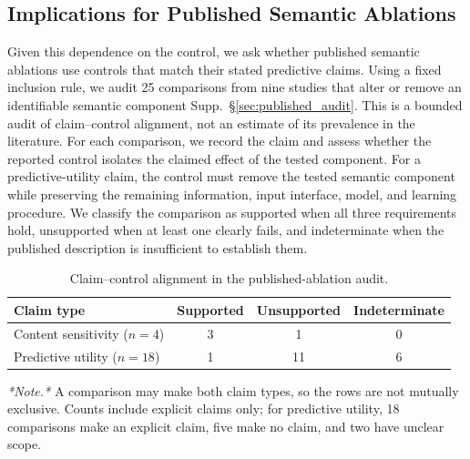 \documentclass{article} %
\newcommand{\supp}[1]{\textnormal{Supp.~#1}}
\begin{document}
\subsection{Implications for Published Semantic Ablations}
\label{sec:broader_scope}

Given this dependence on the control, we ask whether published semantic ablations use controls that match their stated predictive claims.
Using a fixed inclusion rule, we audit 25 comparisons from nine studies that alter or remove an identifiable semantic component \supp{\S\ref{sec:published_audit}}.
This is a bounded audit of claim--control alignment, not an estimate of its prevalence in the literature.
For each comparison, we record the claim and assess whether the reported control isolates the claimed effect of the tested component.
For a predictive-utility claim, the control must remove the tested semantic component while preserving the remaining information, input interface, model, and learning procedure.
We classify the comparison as supported when all three requirements hold, unsupported when at least one clearly fails, and indeterminate when the published description is insufficient to establish them.

\begin{table}[!ht]
\centering
\vspace{-0.4em}

\caption{Claim--control alignment in the published-ablation audit.}
\label{tab:published_audit}
\vspace{0.1em}

\fontsize{8pt}{9pt}\selectfont
\setlength{\tabcolsep}{3pt}
\renewcommand{\arraystretch}{0.95}

\begin{tabular}{@{}lccc@{}}
\toprule
Claim type & Supported & Unsupported & Indeterminate \\
\midrule
Content sensitivity ($n=4$) & 3 & 1 & 0 \\
Predictive utility ($n=18$) & 1 & 11 & 6 \\
\bottomrule
\end{tabular}

\vspace{1pt}

{\scriptsize \emph{*Note.*} A comparison may make both claim types, so the rows are not mutually exclusive.
Counts include explicit claims only; for predictive utility, 18 comparisons make an explicit claim, five make no claim, and two have unclear scope.}

\vspace{-0.5em}
\end{table}
\end{document}
